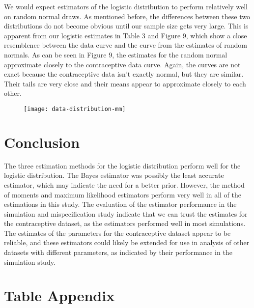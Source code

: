 \documentclass{svproc}
\begin{document}
We would expect estimators of the logistic distribution to perform relatively well on random normal draws. As mentioned before, the differences between these two distributions do not become obvious until our sample size gets very large. This is apparent from our logistic estimates in Table 3 and Figure 9, which show a close resemblence between the data curve and the curve from the estimates of random normals. As can be seen in Figure 9, the estimates for the random normal approximate closely to the contraceptive data curve. Again, the curves are not exact because the contraceptive data isn't exactly normal, but they are similar. Their tails are very close and their means appear to approximate closely to each other.

\begin{figure}[H]
\begin{center}
\texttt{[image: data-distribution-mm]}
\label{plot9}
\end{center}
\end{figure}

\section{Conclusion}

The three estimation methods for the logistic distribution perform well for the logistic distribution. The Bayes estimator was possibly the least accurate estimator, which may indicate the need for a better prior. However, the method of moments and maximum likelihood estimators perform very well in all of the estimations in this study. The evaluation of the estimator performance in the simulation and mispecification study indicate that we can trust the estimates for the contraceptive dataset, as the estimators performed well in most simulations. The estimates of the parameters for the contraceptive dataset appear to be reliable, and these estimators could likely be extended for use in analysis of other datasets with different parameters, as indicated by their performance in the simulation study.

\newpage

\appendix

\section{Table Appendix}
\end{document}
